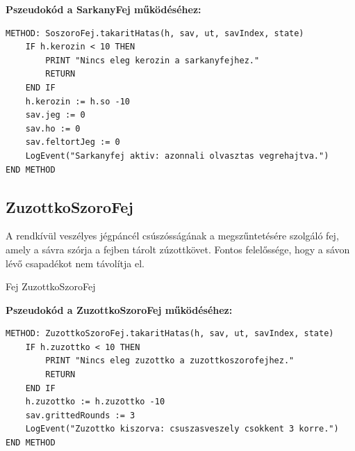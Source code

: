 \textbf{Pszeudokód a SarkanyFej működéséhez:}
\begin{verbatim}
METHOD: SoszoroFej.takaritHatas(h, sav, ut, savIndex, state)
    IF h.kerozin < 10 THEN
        PRINT "Nincs eleg kerozin a sarkanyfejhez."
        RETURN
    END IF
    h.kerozin := h.so -10
    sav.jeg := 0
    sav.ho := 0
    sav.feltortJeg := 0
    LogEvent("Sarkanyfej aktiv: azonnali olvasztas vegrehajtva.")
END METHOD
\end{verbatim}

\subsection{ZuzottkoSzoroFej}
\begin{class-template-responsibility}
A    rendkívül veszélyes jégpáncél csúszósságának a megszűntetésére szolgáló fej, amely a sávra szórja a fejben tárolt zúzottkövet. Fontos felelőssége, hogy a sávon lévő csapadékot nem távolítja el.
\end{class-template-responsibility}
\begin{class-template-baseclass}
    Fej \baseclass ZuzottkoSzoroFej
\end{class-template-baseclass}
\begin{class-template-attribute}
\end{class-template-attribute}
\begin{class-template-method}
\end{class-template-method}

\textbf{Pszeudokód a ZuzottkoSzoroFej működéséhez:}
\begin{verbatim}
METHOD: ZuzottkoSzoroFej.takaritHatas(h, sav, ut, savIndex, state)
    IF h.zuzottko < 10 THEN
        PRINT "Nincs eleg zuzottko a zuzottkoszorofejhez."
        RETURN
    END IF
    h.zuzottko := h.zuzottko -10
    sav.grittedRounds := 3
    LogEvent("Zuzottko kiszorva: csuszasveszely csokkent 3 korre.")
END METHOD
\end{verbatim}

